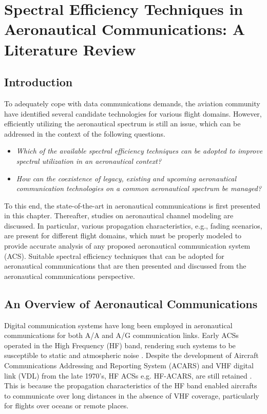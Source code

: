 \chapter{Spectral Efficiency Techniques in Aeronautical Communications: A Literature Review}
\label{chap:lit_review}
\section{Introduction}
To adequately cope with data communications demands, the aviation community have identified several candidate technologies for various flight domains. However, efficiently utilizing the aeronautical spectrum is still an issue, which can be addressed in the context of the following questions.

\begin{itemize}
	\item \textit{Which of the available spectral efficiency techniques can be adopted to improve spectral utilization in an aeronautical context?}
	\item \textit{How can the coexistence of legacy, existing and upcoming aeronautical communication technologies on a common aeronautical spectrum be managed?}
\end{itemize}

To this end, the state-of-the-art in aeronautical communications is first presented in this chapter. Thereafter, studies on aeronautical channel modeling are discussed. In particular, various propagation characteristics, e.g., fading scenarios, are present for different flight domains, which must be properly modeled to provide accurate analysis of any proposed aeronautical communication system (ACS). Suitable spectral efficiency techniques that can be adopted for aeronautical communications that are then presented and discussed from the aeronautical communications perspective.


\section{An Overview of Aeronautical Communications}
Digital communication systems have long been employed in aeronautical communications for both A/A and A/G communication links. Early ACSs operated in the High Frequency (HF) band, rendering such systems to be susceptible to static and atmospheric noise \cite{stacey2008aeronautical}. Despite the development of Aircraft Communications Addressing and Reporting System (ACARS) and VHF digital link (VDL) from the late 1970's, HF ACSs e.g. HF-ACARS, are still retained \cite{stacey2008aeronautical}. This is because the propagation characteristics of the HF band enabled aircrafts to communicate over long distances in the absence of VHF coverage, particularly for flights over oceans or remote places. 


